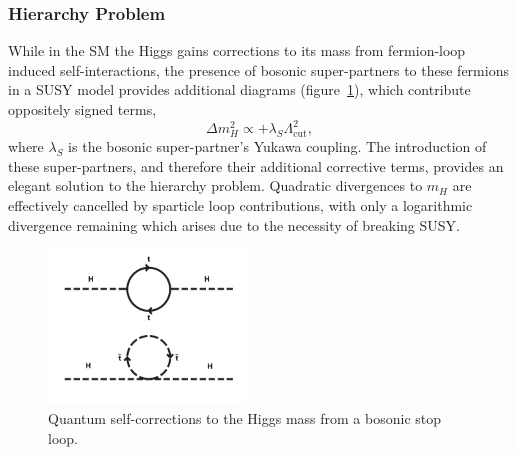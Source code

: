 \subsubsection{Hierarchy Problem}
While in the SM the Higgs gains corrections to its mass from fermion-loop
induced self-interactions, the presence of bosonic super-partners to these
fermions in a SUSY model provides additional diagrams (figure~\ref{fig:quantum_higgs_sboson_loop}),
which contribute oppositely signed terms,
% 
\begin{equation}
\Delta m_H^2 \propto + \lambda_S \Lambda_{\text{cut}}^2 ,
\end{equation}
% 
where $\lambda_S$ is the bosonic super-partner's Yukawa coupling. The introduction
of these super-partners, and therefore their additional corrective terms,
provides an elegant solution to the hierarchy problem. Quadratic
divergences to $m_H$ are effectively cancelled by sparticle loop contributions, with
only a logarithmic divergence remaining which arises due to the necessity of breaking
SUSY.

\begin{figure}[ht!]
\centering
\includegraphics[width=0.47\textwidth,trim=0 0 0 250, clip=true]
{Figs/feynman/600px-Hqmc-vector.png}
\caption{Quantum self-corrections to the Higgs mass from a bosonic stop
loop.}
\label{fig:quantum_higgs_sboson_loop}
\end{figure}

